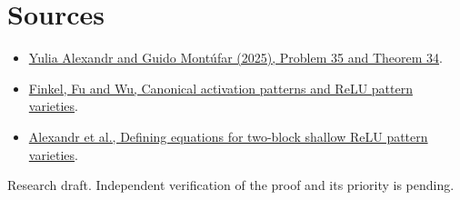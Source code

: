 \documentclass[11pt]{article}
\begin{document}
\section*{Sources}
\begin{itemize}
\item \href{https://arxiv.org/abs/2508.03867}{Yulia Alexandr and Guido Mont\'ufar (2025), Problem 35 and Theorem 34}.
\item \href{https://arxiv.org/abs/2611.20346}{Finkel, Fu and Wu, Canonical activation patterns and ReLU pattern varieties}.
\item \href{https://arxiv.org/abs/2611.23846}{Alexandr et al., Defining equations for two-block shallow ReLU pattern varieties}.
\end{itemize}
{\small Research draft. Independent verification of the proof and its priority is pending.}
\end{document}
